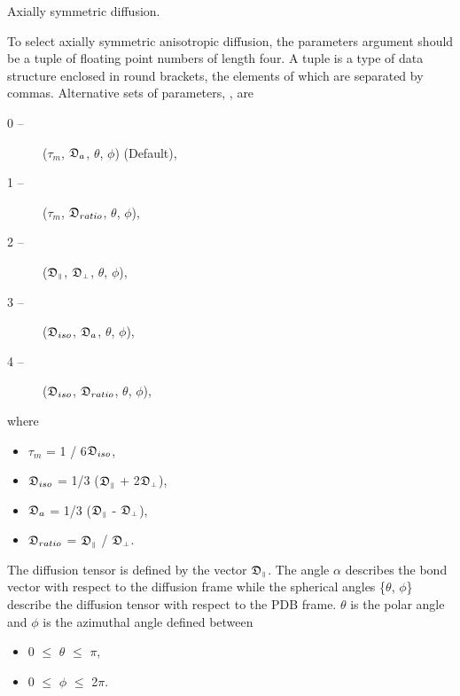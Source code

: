 Axially symmetric diffusion.


To select axially symmetric anisotropic diffusion, the parameters argument should be a tuple of floating point numbers of length four.  A tuple is a type of data structure enclosed in round brackets, the elements of which are separated by commas.  Alternative sets of parameters, , are


\begin{description}
\item[0 --]  ($\tau_m$, $\mathfrak{D}_a$, $\theta$, $\phi$)   (Default), 
\item[1 --]  ($\tau_m$, $\mathfrak{D}_{ratio}$, $\theta$, $\phi$), 
\item[2 --]  ($\mathfrak{D}_{\scriptscriptstyle \parallel}$, $\mathfrak{D}_{\scriptscriptstyle \perp}$, $\theta$, $\phi$), 
\item[3 --]  ($\mathfrak{D}_{iso}$, $\mathfrak{D}_a$, $\theta$, $\phi$), 
\item[4 --]  ($\mathfrak{D}_{iso}$, $\mathfrak{D}_{ratio}$, $\theta$, $\phi$), 
\end{description}


where


\begin{itemize}
\item[] $\tau_m$ = 1 / 6$\mathfrak{D}_{iso}$, 
\item[] $\mathfrak{D}_{iso}$ = 1/3 ($\mathfrak{D}_{\scriptscriptstyle \parallel}$ + 2$\mathfrak{D}_{\scriptscriptstyle \perp}$), 
\item[] $\mathfrak{D}_a$ = 1/3 ($\mathfrak{D}_{\scriptscriptstyle \parallel}$ - $\mathfrak{D}_{\scriptscriptstyle \perp}$), 
\item[] $\mathfrak{D}_{ratio}$ = $\mathfrak{D}_{\scriptscriptstyle \parallel}$ / $\mathfrak{D}_{\scriptscriptstyle \perp}$. 
\end{itemize}


The diffusion tensor is defined by the vector $\mathfrak{D}_{\scriptscriptstyle \parallel}$.  The angle $\alpha$ describes the bond vector with respect to the diffusion frame while the spherical angles \{$\theta$, $\phi$\} describe the diffusion tensor with respect to the PDB frame.  $\theta$ is the polar angle and $\phi$ is the azimuthal angle defined between


\begin{itemize}
\item[] 0 $\le$ $\theta$ $\le$ $\pi$, 
\item[] 0 $\le$ $\phi$ $\le$ 2$\pi$. 
\end{itemize}


